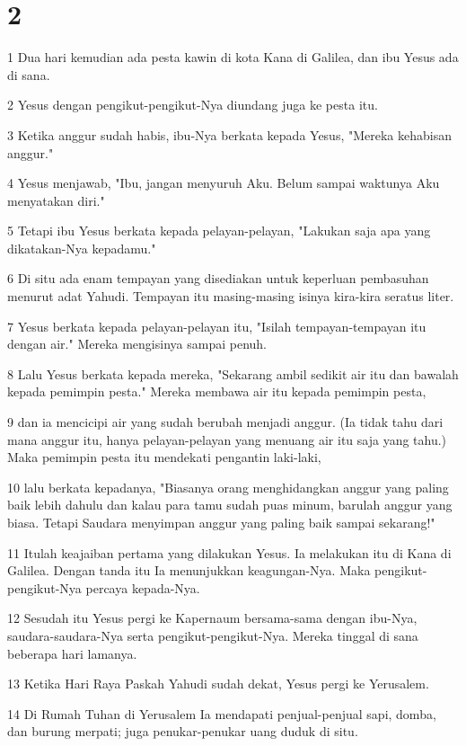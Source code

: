 \chapter{2}

\par 1 Dua hari kemudian ada pesta kawin di kota Kana di Galilea, dan ibu Yesus ada di sana.
\par 2 Yesus dengan pengikut-pengikut-Nya diundang juga ke pesta itu.
\par 3 Ketika anggur sudah habis, ibu-Nya berkata kepada Yesus, "Mereka kehabisan anggur."
\par 4 Yesus menjawab, "Ibu, jangan menyuruh Aku. Belum sampai waktunya Aku menyatakan diri."
\par 5 Tetapi ibu Yesus berkata kepada pelayan-pelayan, "Lakukan saja apa yang dikatakan-Nya kepadamu."
\par 6 Di situ ada enam tempayan yang disediakan untuk keperluan pembasuhan menurut adat Yahudi. Tempayan itu masing-masing isinya kira-kira seratus liter.
\par 7 Yesus berkata kepada pelayan-pelayan itu, "Isilah tempayan-tempayan itu dengan air." Mereka mengisinya sampai penuh.
\par 8 Lalu Yesus berkata kepada mereka, "Sekarang ambil sedikit air itu dan bawalah kepada pemimpin pesta." Mereka membawa air itu kepada pemimpin pesta,
\par 9 dan ia mencicipi air yang sudah berubah menjadi anggur. (Ia tidak tahu dari mana anggur itu, hanya pelayan-pelayan yang menuang air itu saja yang tahu.) Maka pemimpin pesta itu mendekati pengantin laki-laki,
\par 10 lalu berkata kepadanya, "Biasanya orang menghidangkan anggur yang paling baik lebih dahulu dan kalau para tamu sudah puas minum, barulah anggur yang biasa. Tetapi Saudara menyimpan anggur yang paling baik sampai sekarang!"
\par 11 Itulah keajaiban pertama yang dilakukan Yesus. Ia melakukan itu di Kana di Galilea. Dengan tanda itu Ia menunjukkan keagungan-Nya. Maka pengikut-pengikut-Nya percaya kepada-Nya.
\par 12 Sesudah itu Yesus pergi ke Kapernaum bersama-sama dengan ibu-Nya, saudara-saudara-Nya serta pengikut-pengikut-Nya. Mereka tinggal di sana beberapa hari lamanya.
\par 13 Ketika Hari Raya Paskah Yahudi sudah dekat, Yesus pergi ke Yerusalem.
\par 14 Di Rumah Tuhan di Yerusalem Ia mendapati penjual-penjual sapi, domba, dan burung merpati; juga penukar-penukar uang duduk di situ.
